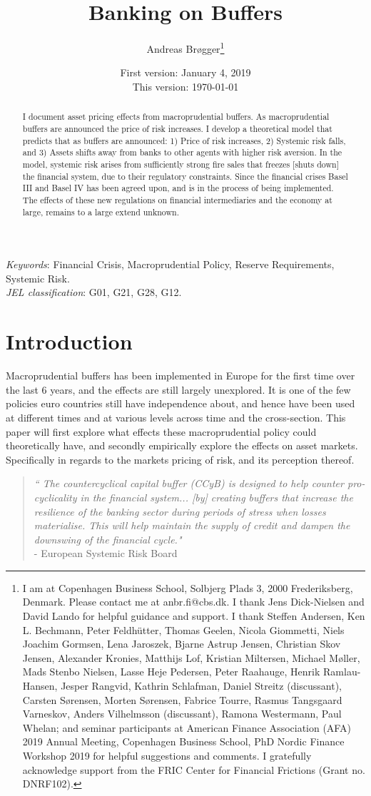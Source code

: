 \documentclass[11pt]{article}
\title{\Huge Banking on Buffers}
\author{\Large Andreas Br\o gger\thanks{
\small
I am at Copenhagen Business School, Solbjerg Plads 3, 2000 Frederiksberg, Denmark.
Please contact me at anbr.fi@cbs.dk.
I thank Jens Dick-Nielsen and David Lando for helpful guidance and support.
I thank Steffen Andersen, Ken L. Bechmann, Peter Feldh\"{u}tter, Thomas Geelen, Nicola Giommetti, Niels Joachim Gormsen, Lena Jaroszek, Bjarne Astrup Jensen, Christian Skov Jensen, Alexander Kronies, Matthijs Lof, Kristian Miltersen, Michael M\o ller, Mads Stenbo Nielsen, Lasse Heje Pedersen, Peter Raahauge, Henrik Ramlau-Hansen, Jesper Rangvid, Kathrin Schlafman, Daniel Streitz (discussant), Carsten S\o rensen, Morten S\o rensen, Fabrice Tourre, Rasmus Tangsgaard Varneskov, Anders Vilhelmsson (discussant), Ramona Westermann, Paul Whelan; and seminar participants at American Finance Association (AFA) 2019 Annual Meeting, Copenhagen Business School, PhD Nordic Finance Workshop 2019 for helpful suggestions and comments. I gratefully acknowledge support from the FRIC Center for Financial Frictions (Grant no. DNRF102).}
}
\date{\Large First version: January 4, 2019\\This version: \today}
\begin{document}
\maketitle

\begin{abstract}
\noindent I document asset pricing effects from macroprudential buffers. As macroprudential buffers are announced the price of risk increases. I develop a theoretical model that predicts that as buffers are announced: 1) Price of risk increases, 2) Systemic risk falls, and 3) Assets shifts away from banks to other agents with higher risk aversion. In the model, systemic risk arises from sufficiently strong fire sales that freezes [shuts down] the financial system, due to their regulatory constraints. Since the financial crises Basel III and Basel IV has been agreed upon, and is in the process of being implemented. The effects of these new regulations on financial intermediaries and the economy at large, remains to a large extend unknown.
\end{abstract}

\noindent \textit{Keywords}: Financial Crisis, Macroprudential Policy, Reserve Requirements, Systemic Risk.\\
\noindent \textit{JEL classification}: G01, G21, G28, G12.

\clearpage
\renewcommand{\thefootnote}{\arabic{footnote}}


\section*{Introduction}
Macroprudential buffers has been implemented in Europe for the first time over the last 6 years, and the effects are still largely unexplored. It is one of the few policies euro countries still have independence about, and hence have been used at different times and at various levels across time and the cross-section. This paper will first explore what effects these macroprudential policy could theoretically have, and secondly empirically explore the effects on asset markets. Specifically in regards to the markets pricing of risk, and its perception thereof.

\begin{quote}\textit{``
The countercyclical capital buffer (CCyB) is designed to help counter pro-cyclicality in the financial system... [by] creating buffers that increase the resilience of the banking sector during periods of stress when losses materialise. This will help maintain the supply of credit and dampen the downswing of the financial cycle."}\\
\hspace{1em}- {European Systemic Risk Board}
\end{quote}
\end{document}
